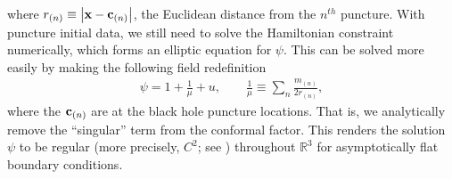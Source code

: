 \documentclass{ws-ijmpd}
\begin{document}
where $r_{(n)}\equiv\left|{\bf x} - {\bf c}_{(n)}\right|$, the
Euclidean distance from the $n^{th}$ puncture.
With puncture initial data, we still need to solve the Hamiltonian
constraint numerically, which forms an elliptic equation for $\psi$.
This can be solved more easily by making the following field
redefinition\cite{Brandt:1997tf}
\begin{align}
   \psi
   =
   1
   +
   \frac{1}{\mu}
   +
   u
   ,\qquad
   \frac{1}{\mu}
   \equiv
   \sum_{n}\frac{m_{(n)}}{2r_{(n)}}
   ,
\end{align}
where the ${\bf c}_{(n)}$ are at the black hole puncture locations.
That is, we analytically remove the ``singular'' 
term from the conformal factor.
This renders the solution $\psi$ to be regular 
(more precisely, $C^2$; see )
throughout $\mathbb{R}^3$ for asymptotically flat boundary conditions.
\end{document}
